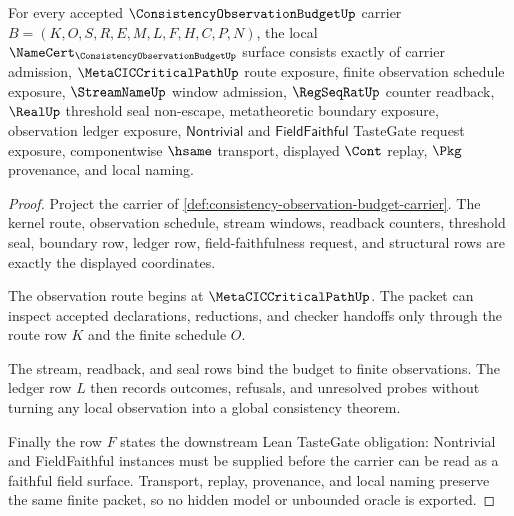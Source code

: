 \begin{theorem}
\label{thm:consistency-observation-budget-namecert-obligations}
For every accepted $\ConsistencyObservationBudgetUp$ carrier $B=(K,O,S,R,E,M,L,F,H,C,P,N)$, the local $\NameCert_{\ConsistencyObservationBudgetUp}$ surface consists exactly of carrier admission, $\MetaCICCriticalPathUp$ route exposure, finite observation schedule exposure, $\StreamNameUp$ window admission, $\RegSeqRatUp$ counter readback, $\RealUp$ threshold seal non-escape, metatheoretic boundary exposure, observation ledger exposure, $\mathsf{Nontrivial}$ and $\mathsf{FieldFaithful}$ TasteGate request exposure, componentwise $\hsame$ transport, displayed $\Cont$ replay, $\Pkg$ provenance, and local naming.
\end{theorem}
\begin{proof}
Project the carrier of \autoref{def:consistency-observation-budget-carrier}. The kernel route, observation schedule, stream windows, readback counters, threshold seal, boundary row, ledger row, field-faithfulness request, and structural rows are exactly the displayed coordinates.

The observation route begins at $\MetaCICCriticalPathUp$. The packet can inspect accepted declarations, reductions, and checker handoffs only through the route row $K$ and the finite schedule $O$.

The stream, readback, and seal rows bind the budget to finite observations. The ledger row $L$ then records outcomes, refusals, and unresolved probes without turning any local observation into a global consistency theorem.

Finally the row $F$ states the downstream Lean TasteGate obligation: Nontrivial and FieldFaithful instances must be supplied before the carrier can be read as a faithful field surface. Transport, replay, provenance, and local naming preserve the same finite packet, so no hidden model or unbounded oracle is exported.
\end{proof}

